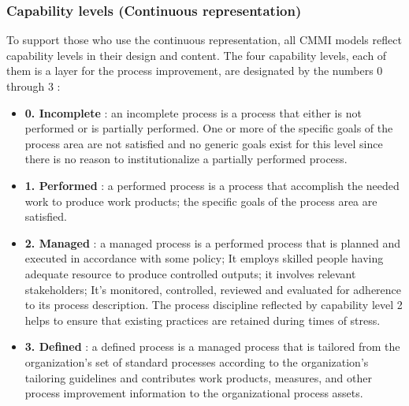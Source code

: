 \documentclass[11pt]{article}
\begin{document}
\subsubsection{Capability levels (Continuous representation)}
To support those who use the continuous representation, all CMMI models reflect capability levels in their design and content. The four capability levels, each of them is a layer for the process improvement, are designated by the numbers 0 through 3 :
\begin{itemize}
\item \textbf{0. Incomplete} : an incomplete process is a process that either is not performed or is partially performed. One or more of the specific goals of the process area are not satisfied and no generic goals exist for this level since there is no reason to institutionalize a partially performed process.
\item \textbf{1. Performed} : a performed process is a process that accomplish the needed work to produce work products; the specific goals of the process area are satisfied.
\item \textbf{2. Managed} : a managed process is a performed process that is planned and executed in accordance with some policy; It employs skilled people having adequate resource to produce controlled outputs; it involves relevant stakeholders; It's monitored, controlled, reviewed and evaluated for adherence to its process description. The process discipline reflected by capability level 2 helps to ensure that existing practices are retained during times of stress.
\item \textbf{3. Defined} : a defined process is a managed process that is tailored from the organization's set of standard processes according to the organization's tailoring guidelines and contributes work products, measures, and other process improvement information to the organizational process assets.
\end{itemize}
\end{document}
